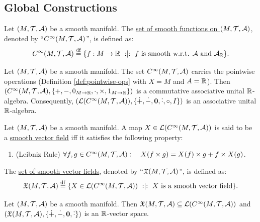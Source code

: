 \documentclass[11pt,reqno]{amsart}
\newcommand{\pwplus}{\mathbin{\dot{+}}}
\newcommand{\pwminus}{\mathbin{\dot{-}}}
\newcommand{\pwcdot}{\mathbin{\dot{\cdot}}}
\begin{document}
\subsection{Global Constructions}
\begin{Def}
Let $(M,\mathcal{T},\mathcal{A})$ be a smooth manifold.
The \ul{set of smooth functions on $(M,\mathcal{T},\mathcal{A})$}, denoted by
``$C^{\infty}(M,\mathcal{T},\mathcal{A})$'', is defined as:
\[
C^{\infty}(M,\T,\A) \df
\set{f:M\to\R\st f~\text{is smooth w.r.t. $\A$ and $\A_\R$}}.
\]
\end{Def}

\begin{Thm}\label{thm:Cinfty-algebra}
Let $(M,\mathcal{T},\mathcal{A})$ be a smooth manifold.
The set $C^\infty(M,\mathcal{T},\mathcal{A})$ carries the pointwise operations
(Definition \ref{def:pointwise-ops} with $X=M$ and $A=\mathbb{R}$).
Then $\Br{C^\infty(M,\T,\A),\set{+,-,0_{M\to\R},\cdot,\times,1_{M\to\R}}}$
is a commutative associative unital $\mathbb{R}$-algebra.
Consequently,
$\Br{\L\Br{C^\infty(M,\T,\A)},\set{\pwplus,\pwminus,\bm0,\pwcdot,\circ,I}}$
is an associative unital $\mathbb{R}$-algebra.
\end{Thm}


\begin{Def}
Let $(M,\mathcal{T},\mathcal{A})$ be a smooth manifold.
A map $X\in\L\Br{C^\infty(M,\T,\A)}$
is said to be a \ul{smooth vector field} iff
it satisfies the following property:
\begin{enumerate}
\item (Leibniz Rule)
$\forall f,g\in C^\infty(M,\mathcal{T},\mathcal{A}):\quad
X(f\times g)=X(f)\times g+f\times X(g)$.
\end{enumerate}
The \ul{set of smooth vector fields}, denoted by ``$\mathfrak{X}(M,\mathcal{T},\mathcal{A})$'', is
defined as:
\[\X(M,\T,\A)\df
\set{X\in\L\Br{C^\infty(M,\T,\A)}\st
X~\text{is a smooth vector field}}.
\]
\end{Def}

\begin{lemma}\label{lem:vector-fields-vec-space}
Let $(M,\mathcal{T},\mathcal{A})$ be a smooth manifold.
Then $\X(M,\T,\A)\subseteq\L\Br{C^\infty(M,\T,\A)}$ and
$\Br{\X(M,\T,\A),\set{\pwplus,\pwminus,\bm0,\pwcdot}}$
is an $\mathbb{R}$-vector space.
\end{lemma}
\end{document}
